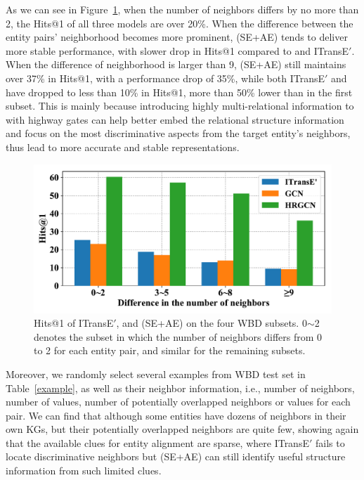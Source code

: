 As we can see in Figure~\ref{subset}, when the number of neighbors differs by no more than 2, the Hits@1 of all three models are over 20\%.
When the difference between the entity pairs' neighborhood becomes more prominent,
\HRGCN (SE+AE) tends to deliver more stable performance, with slower drop in Hits@1 compared to \GCN and ITransE$'$.
When the difference of neighborhood is larger than 9, \HRGCN (SE+AE) still maintains over 37\% in Hits@1, with a performance drop of 35\%, while both ITransE$'$ and \GCN have dropped to less than 10\% in Hits@1, more than 50\% lower than in the first subset.
This is mainly because introducing highly multi-relational information to \GCN with highway gates can help better embed the relational structure information and focus on the most discriminative aspects from the target entity's neighbors, thus lead to more accurate and stable representations.
\begin{figure}
	\centering
	\includegraphics[width=1\linewidth]{figures/graph4.pdf}
	\caption{Hits@1 of ITransE$'$, \GCN and \HRGCN (SE+AE) on the four WBD subsets. 0$\sim$2 denotes the subset in which the number of neighbors differs from 0 to 2 for each entity pair, and similar for the remaining subsets.}
	\label{subset}
\end{figure}

Moreover, we randomly select several examples from WBD test set in Table~\ref{example},
as well as their neighbor information, i.e., number of neighbors, number of values, number of potentially overlapped neighbors or values for each pair.
We can find that although some entities have dozens of neighbors in their own KGs, but their potentially overlapped neighbors are quite few, showing again that
the available clues for entity alignment are sparse,
 where ITransE$'$ fails to locate discriminative neighbors but \HRGCN (SE+AE) can still identify useful structure information from such limited clues.

